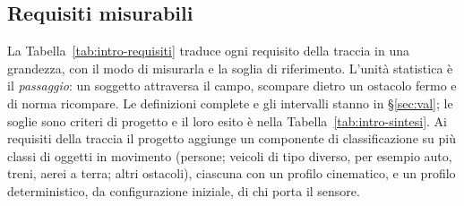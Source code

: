 \subsection{Requisiti misurabili}\label{sec:intro-requisiti}

La Tabella~\ref{tab:intro-requisiti} traduce ogni requisito della traccia in una grandezza, con il modo di misurarla e la soglia di riferimento. L'unità statistica è il \emph{passaggio}: un soggetto attraversa il campo, scompare dietro un ostacolo fermo e di norma ricompare. Le definizioni complete e gli intervalli stanno in \S\ref{sec:val}; le soglie sono criteri di progetto e il loro esito è nella Tabella~\ref{tab:intro-sintesi}. Ai requisiti della traccia il progetto aggiunge un componente di classificazione su più classi di oggetti in movimento (persone; veicoli di tipo diverso, per esempio auto, treni, aerei a terra; altri ostacoli), ciascuna con un profilo cinematico, e un profilo deterministico, da configurazione iniziale, di chi porta il sensore.

